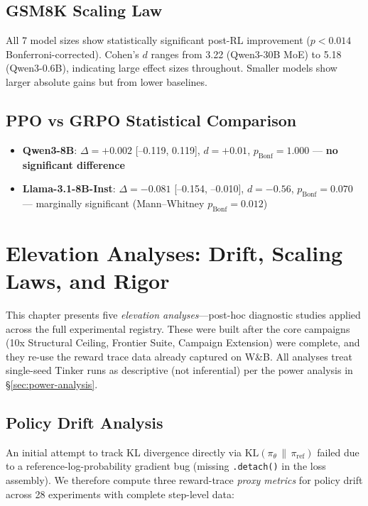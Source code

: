 \documentclass[12pt,a4paper]{report}
\theoremstyle{definition}
\begin{document}
\section{GSM8K Scaling Law}
\label{sec:gsm8k-scaling}

All 7 model sizes show statistically significant post-RL improvement ($p < 0.014$ Bonferroni-corrected).
Cohen's $d$ ranges from 3.22 (Qwen3-30B MoE) to 5.18 (Qwen3-0.6B), indicating large effect sizes throughout.
Smaller models show larger absolute gains but from lower baselines.

\section{PPO vs GRPO Statistical Comparison}
\label{sec:ppo-grpo-stats}

\begin{itemize}[nosep]
\item \textbf{Qwen3-8B}: $\Delta = +0.002$ [--0.119, 0.119], $d = +0.01$, $p_{\text{Bonf}} = 1.000$ --- \textbf{no significant difference}
\item \textbf{Llama-3.1-8B-Inst}: $\Delta = -0.081$ [--0.154, --0.010], $d = -0.56$, $p_{\text{Bonf}} = 0.070$ --- marginally significant (Mann--Whitney $p_{\text{Bonf}} = 0.012$)
\end{itemize}





\chapter{Elevation Analyses: Drift, Scaling Laws, and Rigor}
\label{ch:elevation}

This chapter presents five \emph{elevation analyses}---post-hoc diagnostic studies applied across the full
experimental registry. These were built after the core campaigns (10x Structural Ceiling, Frontier
Suite, Campaign Extension) were complete, and they re-use the reward trace data already captured on
W\&B. All analyses treat single-seed Tinker runs as descriptive (not inferential) per the power analysis
in \S\ref{sec:power-analysis}.

\section{Policy Drift Analysis}
\label{sec:policy-drift}

An initial attempt to track KL divergence directly via
$\mathrm{KL}(\pi_\theta \,\|\, \pi_{\text{ref}})$ failed due to a reference-log-probability gradient bug
(missing \texttt{.detach()} in the loss assembly). We therefore compute three reward-trace \emph{proxy
metrics} for policy drift across 28 experiments with complete step-level data:
\end{document}
